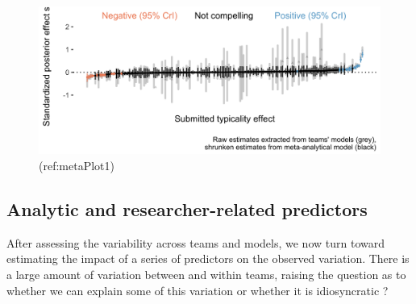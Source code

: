 \documentclass[Review,times,sageh]{sagej}
\begin{document}
\begin{figure}
\includegraphics[width=1\linewidth]{../figs/meta_plot1_shrinkage} \caption{(ref:metaPlot1)}\label{fig:plot-meta1}
\end{figure}

\hypertarget{analytic-and-researcher-related-predictors}{%
\subsection{Analytic and researcher-related predictors}\label{analytic-and-researcher-related-predictors}}

After assessing the variability across teams and models, we now turn toward estimating the impact of a series of predictors on the observed variation.
There is a large amount of variation between and within teams, raising the question as to whether we can explain some of this variation or whether it is idiosyncratic \citep{breznau2021observing}?
\end{document}
